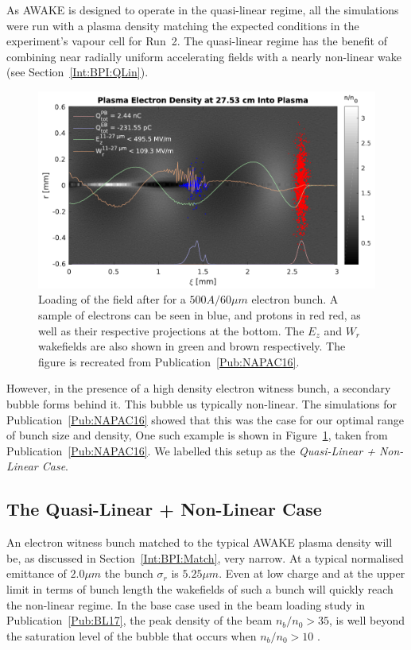 As AWAKE is designed to operate in the quasi-linear regime, all the simulations were run with a plasma density matching the expected conditions in the experiment's vapour cell for Run~2.
The quasi-linear regime has the benefit of combining near radially uniform accelerating fields with a nearly non-linear wake (see Section~\ref{Int:BPI:QLin}).

\begin{figure}[hbt]
    \centering
    \includegraphics[width=0.8125\linewidth]{figures/NAPACPlasmaDensity}
    \caption{\label{Fig:SimA:NAPACPD}
        Loading of the field after for a $500\unit{A}/60\unit{\mu m}$ electron bunch.
        A sample of electrons can be seen in blue, and protons in red red, as well as their respective projections at the bottom.
        The $E_z$ and $W_r$ wakefields are also shown in green and brown respectively.
        The figure is recreated from Publication~\ref{Pub:NAPAC16}.
    }
\end{figure}

However, in the presence of a high density electron witness bunch, a secondary bubble forms behind it.
This bubble us typically non-linear.
The simulations for Publication~\ref{Pub:NAPAC16} showed that this was the case for our optimal range of bunch size and density,
One such example is shown in Figure~\ref{Fig:SimA:NAPACPD}, taken from Publication~\ref{Pub:NAPAC16}.
We labelled this setup as the \textit{Quasi-Linear + Non-Linear Case}.

\subsection{The Quasi-Linear + Non-Linear Case}
\label{SimA:QLinNonLin}

An electron witness bunch matched to the typical AWAKE plasma density will be, as discussed in Section~\ref{Int:BPI:Match}, very narrow.
At a typical normalised emittance of $2.0\unit{\mu m}$ the bunch $\sigma_r$ is $5.25\unit{\mu m}$.
Even at low charge and at the upper limit in terms of bunch length the wakefields of such a bunch will quickly reach the non-linear regime.
In the base case used in the beam loading study in Publication~\ref{Pub:BL17}, the peak density of the beam $n_b/n_0 > 35$, is well beyond the saturation level of the bubble that occurs when $n_b/n_0 > 10$ \cite{lu:2005}.

